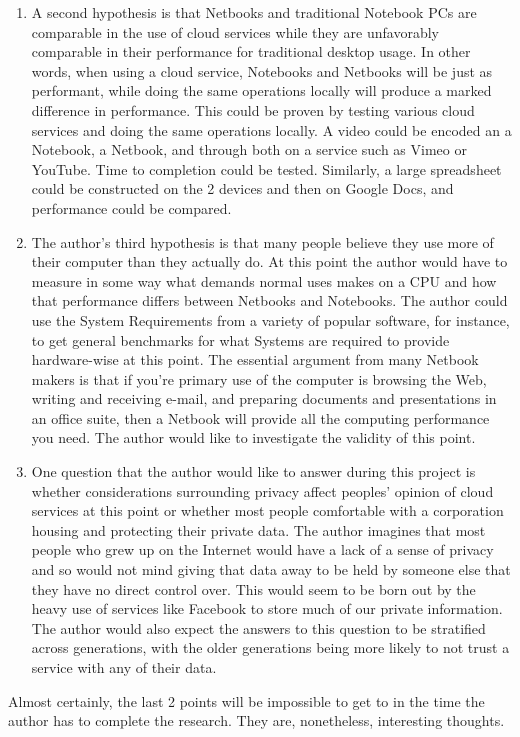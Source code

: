 \documentclass[12pt,oneside,letterpaper]{article}
\begin{document}
\begin{enumerate}
\item A second hypothesis is that Netbooks and traditional Notebook PCs are
  comparable in the use of cloud services while they are unfavorably comparable
  in their performance for traditional desktop usage.  In other words, when
  using a cloud service, Notebooks and Netbooks will be just as performant,
  while doing the same operations locally will produce a marked difference in
  performance.  This could be proven by testing various cloud services and doing
  the same operations locally.  A video could be encoded an a Notebook, a
  Netbook, and through both on a service such as Vimeo or YouTube.  Time to
  completion could be tested. Similarly, a large spreadsheet could be
  constructed on the 2 devices and then on Google Docs, and performance could be
  compared.

\item The author's third hypothesis is that many people believe they use more of
  their computer than they actually do.  At this point the author would have to
  measure in some way what demands normal uses makes on a CPU and how that
  performance differs between Netbooks and Notebooks.  The author could use the
  System Requirements from a variety of popular software, for instance, to get
  general benchmarks for what Systems are required to provide hardware-wise at
  this point.  The essential argument from many Netbook makers is that if you're
  primary use of the computer is browsing the Web, writing and receiving e-mail,
  and preparing documents and presentations in an office suite, then a Netbook
  will provide all the computing performance you need.  The author would like to
  investigate the validity of this point.

\item One question that the author would like to answer during this project is
  whether considerations surrounding privacy affect peoples' opinion of cloud
  services at this point or whether most people comfortable with a corporation
  housing and protecting their private data.  The author imagines that most
  people who grew up on the Internet would have a lack of a sense of privacy and
  so would not mind giving that data away to be held by someone else that they
  have no direct control over.  This would seem to be born out by the heavy use
  of services like Facebook to store much of our private information.  The
  author would also expect the answers to this question to be stratified across
  generations, with the older generations being more likely to not trust a
  service with any of their data.

\end{enumerate}

Almost certainly, the last 2 points will be impossible to get to in the time the
author has to complete the research.  They are, nonetheless, interesting thoughts.
\end{document}
